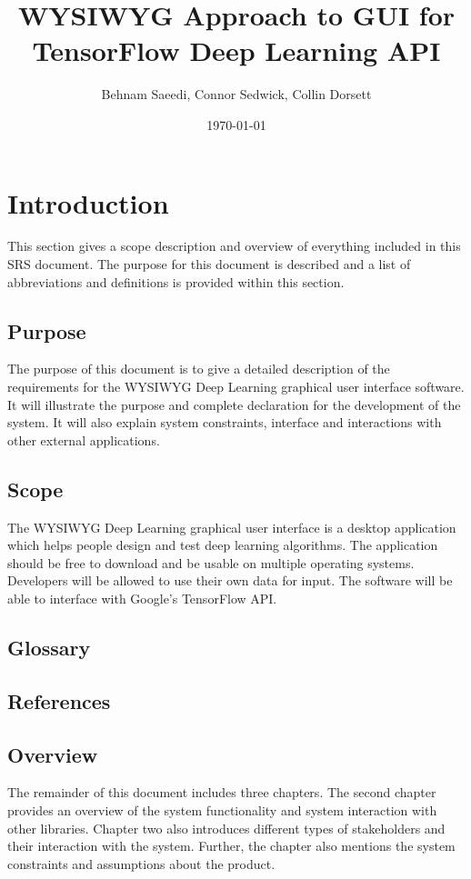 \documentclass[a4paper,10pt]{article} \usepackage[margin=1.0in]{geometry} \usepackage{pdfpages} \usepackage{graphicx}
\title{WYSIWYG Approach to GUI for TensorFlow Deep Learning API}
\author{Behnam Saeedi, Connor Sedwick, Collin Dorsett}
\date{\today}
\begin{document}
\maketitle
\newpage
\tableofcontents
\newpage
\section{Introduction}
This section gives a scope description and overview of everything included in this SRS document. 
The purpose for this document is described and a list of abbreviations and definitions is provided within this section.
\subsection{Purpose}
The purpose of this document is to give a detailed description of the requirements for the WYSIWYG Deep Learning graphical user interface software. It will illustrate the purpose and complete declaration for the development of the system. It will also explain system constraints, interface and interactions with other external applications. 
\subsection{Scope}
The WYSIWYG Deep Learning graphical user interface is a desktop application which helps people design and test deep learning algorithms.
The application should be free to download and be usable on multiple operating systems.
Developers will be allowed to use their own data for input.
The software will be able to interface with Google's TensorFlow API. 
\subsection{Glossary}
\subsection{References}
\subsection{Overview}

The remainder of this document includes three chapters. 
The second chapter provides an overview of the system functionality and system interaction with other libraries. 
Chapter two also introduces different types of stakeholders and their interaction with the system. 
Further, the chapter also mentions the system constraints and assumptions about the product.
\end{document}
